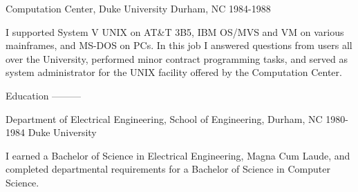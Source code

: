 \documentclass{article}
\begin{document}
Computation Center, Duke University \hfill Durham, NC
1984-1988

I supported System V UNIX on AT\&T 3B5, IBM OS/MVS and VM on
various mainframes, and MS-DOS on PCs. In this job I answered
questions from users all over the University, performed minor
contract programming tasks, and served as system administrator for
the UNIX facility offered by the Computation Center.

Education
---------

Department of Electrical Engineering, School of Engineering, Durham, NC
1980-1984 \hfill Duke University

I earned a Bachelor of Science in Electrical Engineering, Magna
Cum Laude, and completed departmental requirements for a Bachelor
of Science in Computer Science.
\end{document}
